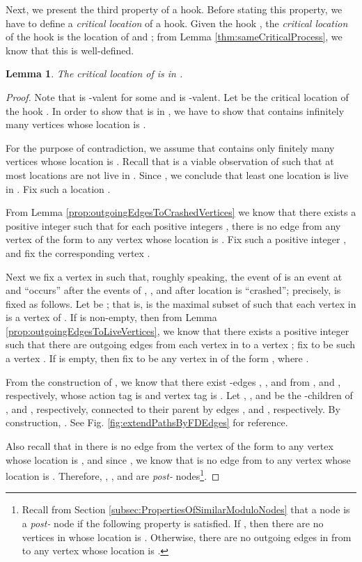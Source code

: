 \documentclass[11pt]{article}
\numberwithin{theorem}{section}
\newtheorem{lemma}[theorem]{Lemma}
\begin{document}
Next, we present the third property of a hook. Before stating this property, we have to define a \emph{critical location} of a hook. Given the hook , the \emph{critical location} of the hook is the location of  and ; from Lemma \ref{thm:sameCriticalProcess}, we know that this is well-defined. 

\begin{lemma}\label{thm:criticalProcessCorrect}
The critical location of  is in .
\end{lemma}

\begin{proof}
Note that  is -valent for some  and  is -valent. 
Let  be the critical location of the hook . 
In order to show that  is in , we have to show that  contains infinitely many vertices whose location is .

For the purpose of contradiction, we assume that  contains only finitely many vertices whose location is . Recall that  is a viable observation of  such that at most  locations are not live in . Since , we conclude that least one location is live in . Fix such a location .



From Lemma \ref{prop:outgoingEdgesToCrashedVertices} we know that there exists a positive integer  such that for each positive integers , there is no edge from any vertex of the form  to any vertex whose location is . Fix such a positive integer , and fix the corresponding vertex .

Next we fix a vertex  in  such that, roughly speaking, the event  of  is an event at  and ``occurs'' after the events of , ,  and after location  is ``crashed''; precisely,  is fixed as follows. Let  be ; that is,  is the maximal subset of  such that each vertex in  is a vertex  of . If  is non-empty, then from Lemma \ref{prop:outgoingEdgesToLiveVertices}, we know that there exists a positive integer  such that there are outgoing edges from each vertex in  to a vertex ; fix  to be such a vertex . If  is empty, then fix  to be any vertex in  of the form , where .

From the construction of , we know that there exist -edges , , and  from ,  and , respectively, whose action tag is  and vertex tag is . Let , , and  be the -children of ,  and , respectively, connected to their parent by edges ,  and , respectively. By construction, . See Fig. \ref{fig:extendPathsByFDEdges} for reference. 

Also recall that in  there is no edge from the vertex of the form  to any vertex whose location is , and since , we know that is no edge from  to any vertex whose location is . Therefore, , , and  are \emph{post-} nodes\footnote{Recall from Section \ref{subsec:PropertiesOfSimilarModuloNodes} that a node  is a \emph{post-} node if the following property is satisfied. If , then there are no vertices in  whose location is . Otherwise, there are no outgoing edges in  from  to any vertex whose location is .}.



\end{proof}
\end{document}
